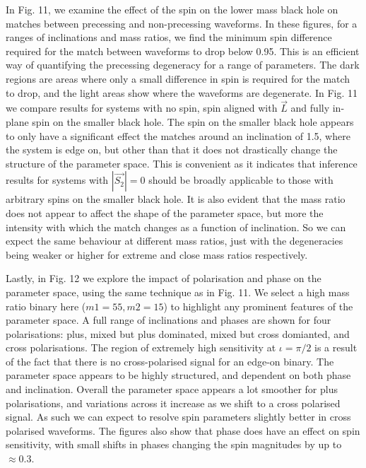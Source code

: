 \documentclass[11pt]{article}
\begin{document}
In Fig. 11, we examine the effect of the spin on the lower mass black hole on matches between precessing and non-precessing waveforms. In these figures, for a ranges of inclinations and mass ratios, we find the minimum spin difference required for the match between waveforms to drop below 0.95. This is an efficient way of quantifying the precessing degeneracy for a range of parameters. The dark regions are areas where only a small difference in spin is required for the match to drop, and the light areas show where the waveforms are degenerate. In Fig. 11 we compare results for systems with no spin, spin aligned with $\vec{L}$ and fully in-plane spin on the smaller black hole. The spin on the smaller black hole appears to only have a significant effect the matches around an inclination of 1.5, where the system is edge on, but other than that it does not drastically change the structure of the parameter space. This is convenient as it indicates that inference results for systems with $|\vec{S_2}|=0$ should be broadly applicable to those with arbitrary spins on the smaller black hole. It is also evident that the mass ratio does not appear to affect the shape of the parameter space, but more the intensity with which the match changes as a function of inclination. So we can expect the same behaviour at different mass ratios, just with the degeneracies being weaker or higher for extreme and close mass ratios respectively.



Lastly, in Fig. 12 we explore the impact of polarisation and phase on the parameter space, using the same technique as in Fig. 11. We select a high mass ratio binary here ($m1=55, m2=15$) to highlight any prominent features of the parameter space. A full range of inclinations and phases are shown for four polarisations: plus, mixed but plus dominated, mixed but cross domianted, and cross polarisations. The region of extremely high sensitivity at $\iota=\pi/2$ is a result of the fact that there is no cross-polarised signal for an edge-on binary. The parameter space appears to be highly structured, and dependent on both phase and inclination. Overall the parameter space appears a lot smoother for plus polarisations, and variations across it increase as we shift to a cross polarised signal. As such we can expect to resolve spin parameters slightly better in cross polarised waveforms. The figures also show that phase does have an effect on spin sensitivity, with small shifts in phases changing the spin magnitudes by up to $\approx0.3$.
\end{document}
